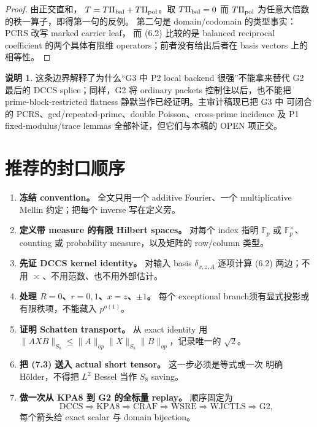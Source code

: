\documentclass[11pt,a4paper]{ctexart}
\theoremstyle{definition}
\newtheorem{remark}[theorem]{说明}
\newcommand{\F}{\mathbb F}
\newcommand{\1}{\mathbf 1}
\begin{document}
\begin{proof}
由正交直和，
$T=T\Pi_{\rm bal}+T\Pi_{\rm pol}$。取 $T\Pi_{\rm bal}=0$ 而
$T\Pi_{\rm pol}$ 为任意大倍数的秩一算子，即得第一句的反例。
第二句是 domain/codomain 的类型事实：PCRS 改写 marked carrier leaf，
而 (6.2) 比较的是 balanced reciprocal coefficient 的两个具体有限维
operators；前者没有给出后者在 basis vectors 上的相等性。
\end{proof}

\begin{remark}
这条边界解释了为什么“G3 中 P2 local backend 很强”不能拿来替代 G2
最后的 DCCS splice；同样，G2 将 ordinary packets 控制住以后，也不能把
prime-block-restricted flatness 静默当作已经证明。主审计稿现已把 G3 中
可闭合的 PCRS、gcd/repeated-prime、double Poisson、cross-prime incidence
及 P1 fixed-modulus/trace lemmas 全部补证，但它们与本稿的 OPEN 项正交。
\end{remark}

\section{推荐的封口顺序}

\begin{enumerate}[label=\textbf{Step \arabic*.}]
\item \textbf{冻结 convention。} 全文只用一个 additive Fourier、一个
multiplicative Mellin 约定；把每个 inverse 写在定义旁。
\item \textbf{定义带 measure 的有限 Hilbert spaces。} 对每个 index 指明
$\F_p$ 或 $\F_p^\times$、counting 或 probability measure，以及矩阵的 row/column 类型。
\item \textbf{先证 DCCS kernel identity。} 对输入 basis
$\delta_{x,z,A}$ 逐项计算 (6.2) 两边；不用 $\asymp$、不用范数、也不用外部估计。
\item \textbf{处理 $R=0$、$r=0,1$、$x=z$、$\pm1$。} 每个 exceptional
branch须有显式投影或有限秩项，不能藏入 $p^{o(1)}$。
\item \textbf{证明 Schatten transport。} 从 exact identity 用
$\|AXB\|_{S_8}\le\|A\|_{op}\|X\|_{S_8}\|B\|_{op}$，记录唯一的 $\sqrt2$。
\item \textbf{把 (7.3) 送入 actual short tensor。} 这一步必须是等式或一次
明确 Hölder，不得把 $L^2$ Bessel 当作 $S_8$ saving。
\item \textbf{做一次从 KPA8 到 G2 的全标量 replay。} 顺序固定为
\[
\mathrm{DCCS}\Rightarrow\mathrm{KPA8}\Rightarrow\mathrm{CRAF}
\Rightarrow\mathrm{WSRE}\Rightarrow\mathrm{WJCTLS}\Rightarrow\mathrm{G2},
\]
每个箭头给 exact scalar 与 domain bijection。
\end{enumerate}
\end{document}
